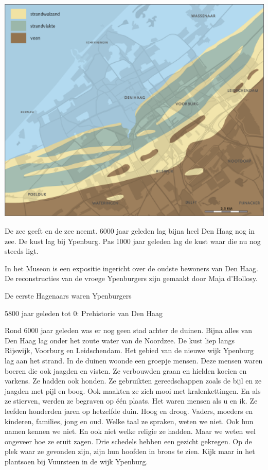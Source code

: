 \documentclass[
  a4paper,
]{book}
\begin{document}
\includegraphics[width=13.4in]{media/image2}

De zee geeft en de zee neemt. 6000 jaar geleden lag bijna heel Den Haag nog in zee. De kust lag bij Ypenburg. Pas 1000 jaar geleden lag de kust waar die nu nog steeds ligt.

In het Museon is een expositie ingericht over de oudste bewoners van Den Haag. De reconstructies van de vroege Ypenburgers zijn gemaakt door Maja d'Hollosy.

De eerste Hagenaars waren Ypenburgers

5800 jaar geleden tot 0: Prehistorie van Den Haag

Rond 6000 jaar geleden was er nog geen stad achter de duinen.
Bijna alles van Den Haag lag onder het zoute water van de Noordzee.
De kust liep langs Rijswijk, Voorburg en Leidschendam.
Het gebied van de nieuwe wijk Ypenburg lag aan het strand.
In de duinen woonde een groepje mensen.
Deze mensen waren boeren die ook jaagden en visten.
Ze verbouwden graan en hielden koeien en varkens.
Ze hadden ook honden.
Ze gebruikten gereedschappen zoals de bijl en ze jaagden met pijl en boog.
Ook maakten ze zich mooi met kralenkettingen.
En als ze stierven, werden ze begraven op één plaats.
Het waren mensen als u en ik.
Ze leefden honderden jaren op hetzelfde duin. Hoog en droog.
Vaders, moeders en kinderen, families, jong en oud.
Welke taal ze spraken, weten we niet.
Ook hun namen kennen we niet.
En ook niet welke religie ze hadden.
Maar we weten wel ongeveer hoe ze eruit zagen.
Drie schedels hebben een gezicht gekregen.
Op de plek waar ze gevonden zijn, zijn hun hoofden in brons te zien.
Kijk maar in het plantsoen bij Vuursteen in de wijk Ypenburg.
\end{document}
